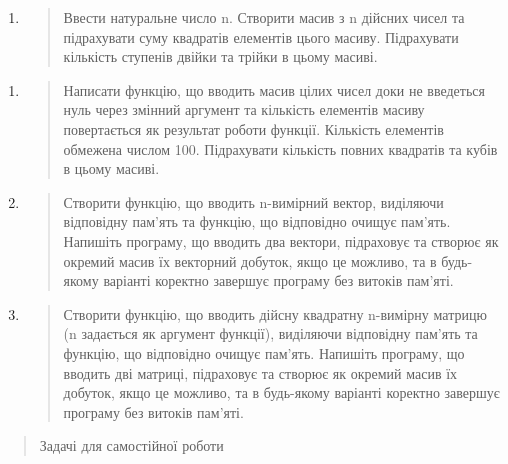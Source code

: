 \documentclass[]{article}
\begin{document}
\begin{enumerate}
\def\labelenumi{\arabic{enumi})}
\item
  \begin{quote}
  Ввести натуральне число n. Створити масив з n дійсних чисел та
  підрахувати суму квадратів елементів цього масиву. Підрахувати
  кількість ступенів двійки та трійки в цьому масиві.
  \end{quote}
\end{enumerate}

\begin{enumerate}
\def\labelenumi{\arabic{enumi})}
\item
  \begin{quote}
  Написати функцію, що вводить масив цілих чисел доки не введеться нуль
  через змінний аргумент та кількість елементів масиву повертається як
  результат роботи функції. Кількість елементів обмежена числом 100.
  Підрахувати кількість повних квадратів та кубів в цьому масиві.
  \end{quote}
\item
  \begin{quote}
  Створити функцію, що вводить n-вимірний вектор, виділяючи відповідну
  пам'ять та функцію, що відповідно очищує пам'ять. Напишіть програму,
  що вводить два вектори, підраховує та створює як окремий масив їх
  векторний добуток, якщо це можливо, та в будь-якому варіанті коректно
  завершує програму без витоків пам'яті.
  \end{quote}
\item
  \begin{quote}
  Створити функцію, що вводить дійсну квадратну n-вимірну матрицю (n
  задається як аргумент функції), виділяючи відповідну пам'ять та
  функцію, що відповідно очищує пам'ять. Напишіть програму, що вводить
  дві матриці, підраховує та створює як окремий масив їх добуток, якщо
  це можливо, та в будь-якому варіанті коректно завершує програму без
  витоків пам'яті.
  \end{quote}
\end{enumerate}

\begin{quote}
Задачі для самостійної роботи
\end{quote}
\end{document}
